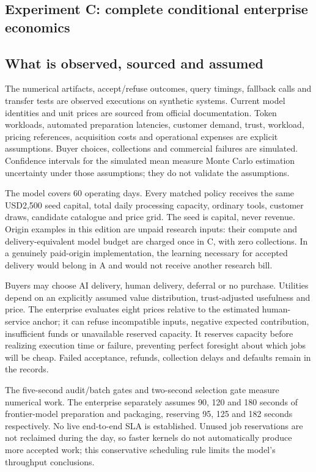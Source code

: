 \documentclass[11pt,letterpaper]{article}
\begin{document}
\begin{samepage}
\section{Experiment C: complete conditional enterprise economics}

\subsection{What is observed, sourced and assumed}

The numerical artifacts, accept/refuse outcomes, query timings, fallback calls and transfer tests are observed executions on synthetic systems. Current model identities and unit prices are sourced from official documentation. Token workloads, automated preparation latencies, customer demand, trust, workload, pricing references, acquisition costs and operational expenses are explicit assumptions. Buyer choices, collections and commercial failures are simulated. Confidence intervals for the simulated mean measure Monte Carlo estimation uncertainty under those assumptions; they do not validate the assumptions.
\end{samepage}

The model covers 60 operating days. Every matched policy receives the same USD2,500 seed capital, total daily processing capacity, ordinary tools, customer draws, candidate catalogue and price grid. The seed is capital, never revenue. Origin examples in this edition are unpaid research inputs: their compute and delivery-equivalent model budget are charged once in C, with zero collections. In a genuinely paid-origin implementation, the learning necessary for accepted delivery would belong in A and would not receive another research bill.

Buyers may choose AI delivery, human delivery, deferral or no purchase. Utilities depend on an explicitly assumed value distribution, trust-adjusted usefulness and price. The enterprise evaluates eight prices relative to the estimated human-service anchor; it can refuse incompatible inputs, negative expected contribution, insufficient funds or unavailable reserved capacity. It reserves capacity before realizing execution time or failure, preventing perfect foresight about which jobs will be cheap. Failed acceptance, refunds, collection delays and defaults remain in the records.

The five-second audit/batch gates and two-second selection gate measure numerical work. The enterprise separately assumes 90, 120 and 180 seconds of frontier-model preparation and packaging, reserving 95, 125 and 182 seconds respectively. No live end-to-end SLA is established. Unused job reservations are not reclaimed during the day, so faster kernels do not automatically produce more accepted work; this conservative scheduling rule limits the model's throughput conclusions.
\end{document}
